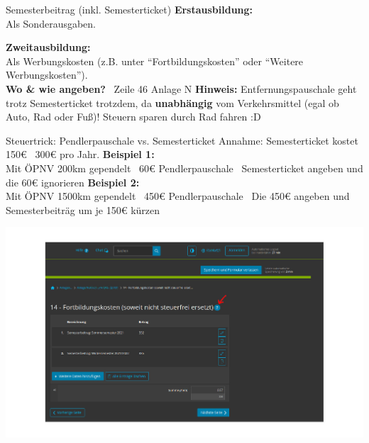 \documentclass{beamer}
\begin{document}
			\begin{frame}{Semesterbeitrag (inkl. Semesterticket)}
				\textbf{Erstausbildung:}\\
				Als Sonderausgaben.\n
				
				\textbf{Zweitausbildung:}\\
				Als Werbungskosten (z.B. unter "`Fortbildungskosten"' oder "`Weitere Werbungskosten"').\n
				\hfill\\\pause
				\textbf{Wo \& wie angeben?} \textrightarrow\ Zeile 46 Anlage N\n\pause
				\textbf{Hinweis:} Entfernungspauschale geht trotz Semesterticket trotzdem, da \textbf{unabhängig} vom Verkehrsmittel (egal ob Auto, Rad oder Fuß)! Steuern sparen durch Rad fahren :D
			\end{frame}
		
			\begin{frame}{Steuertrick: Pendlerpauschale vs. Semesterticket}
				Annahme: Semesterticket kostet 150€ \textrightarrow\ 300€ pro Jahr.\n
				\textbf{Beispiel 1:}\\
				Mit ÖPNV 200km gependelt \textrightarrow\ 60€ Pendlerpauschale \textrightarrow\ Semesterticket angeben und die 60€ ignorieren\n
				\textbf{Beispiel 2:}\\
				Mit ÖPNV 1500km gependelt \textrightarrow\ 450€ Pendlerpauschale \textrightarrow\ Die 450€ angeben und Semesterbeiträg um je 150€ kürzen
			\end{frame}
		
			\begin{frame}
				\begin{center}
					\vspace{-0.6cm}
					\hspace*{-0.91cm}
					\includegraphics[scale=0.24]{images/elster-fortbildungskosten-1}
				\end{center}
			\end{frame}
			
\end{document}
